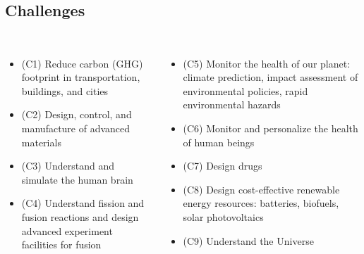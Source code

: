 \subsection{Challenges}
\begin{frame}
  \frametitle{\insertsectionhead}
  \framesubtitle{\insertsubsectionhead}
  \footnotesize
  \begin{columns}
    \begin{itemize}
      \item (C1) Reduce carbon (GHG) footprint in transportation, buildings, and cities
       \item (C2) Design, control, and manufacture of advanced materials
       \item (C3) Understand and simulate the human brain
       \item (C4) Understand fission and fusion reactions and design advanced experiment facilities for fusion
             \end{itemize} 
    \begin{itemize}
      \item (C5) Monitor the health of our planet: climate prediction, impact assessment of environmental policies, rapid environmental hazards

        \item (C6) Monitor and personalize the health of human beings 
       \item (C7) Design drugs
       \item (C8) Design cost-effective renewable energy resources: batteries, biofuels, solar photovoltaics
       \item (C9) Understand the Universe
     \end{itemize} 
  \end{columns}

\end{frame}
